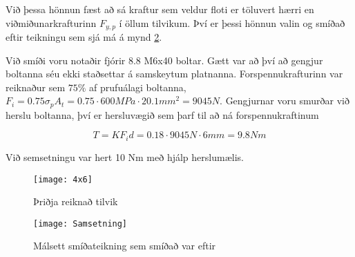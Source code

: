 Við þessa hönnun fæst að sá kraftur sem veldur floti er töluvert hærri en viðmiðunarkrafturinn $F_{y,p}$ í öllum tilvikum. 
Því er þessi hönnun valin og smíðað eftir teikningu sem sjá má á mynd \ref{fig::smidamynd}.

Við smíði voru notaðir fjórir 8.8 M6x40 boltar. Gætt var að því að gengjur boltanna séu ekki staðsettar á samskeytum platnanna. Forspennukrafturinn var reiknaður sem $ 75\% $ af prufuálagi boltanna, \te 
$F_i = 0.75 \sigma_p A_t = 0.75 \cdot 600 MPa \cdot 20.1 mm^2 = 9045N$. Gengjurnar voru smurðar við herslu boltanna, því er hersluvægið sem þarf til að ná forspennukraftinum 

\[
T = K F_i d = 0.18 \cdot 9045N \cdot 6mm = 9.8 Nm
\]

Við semsetningu var hert 10 Nm með hjálp herslumælis.

\begin{figure}
  \centering
  \texttt{[image: 4x6]}
  \caption{Þriðja reiknað tilvik}
  \label{fig::4x6}
\end{figure}

\begin{figure}
	\centering
	\texttt{[image: Samsetning]}
	\caption{Málsett smíðateikning sem smíðað var eftir}
	\label{fig::smidamynd}
\end{figure}